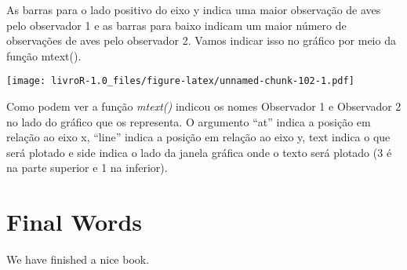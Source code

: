 \documentclass[]{book}
\newenvironment{Shaded}{\begin{snugshade}}{\end{snugshade}}
\newcommand{\DataTypeTok}[1]{\textcolor[rgb]{0.13,0.29,0.53}{#1}}
\newcommand{\DecValTok}[1]{\textcolor[rgb]{0.00,0.00,0.81}{#1}}
\newcommand{\FloatTok}[1]{\textcolor[rgb]{0.00,0.00,0.81}{#1}}
\newcommand{\KeywordTok}[1]{\textcolor[rgb]{0.13,0.29,0.53}{\textbf{#1}}}
\newcommand{\NormalTok}[1]{#1}
\newcommand{\OperatorTok}[1]{\textcolor[rgb]{0.81,0.36,0.00}{\textbf{#1}}}
\newcommand{\StringTok}[1]{\textcolor[rgb]{0.31,0.60,0.02}{#1}}
\begin{document}
As barras para o lado positivo do eixo y indica uma maior observação de aves pelo observador 1 e as barras para baixo indicam um maior número de observações de aves pelo observador 2. Vamos indicar isso no gráfico por meio da função mtext().

\begin{Shaded}
\end{Shaded}

\texttt{[image: livroR-1.0\_files/figure-latex/unnamed-chunk-102-1.pdf]}

Como podem ver a função \emph{mtext()} indicou os nomes Observador 1 e Observador 2 no lado do gráfico que os representa. O argumento ``at'' indica a posição em relação ao eixo x, ``line'' indica a posição em relação ao eixo y, text indica o que será plotado e side indica o lado da janela gráfica onde o texto será plotado (3 é na parte superior e 1 na inferior).

\hypertarget{final-words}{%
\chapter{Final Words}\label{final-words}}

We have finished a nice book.


\end{document}
